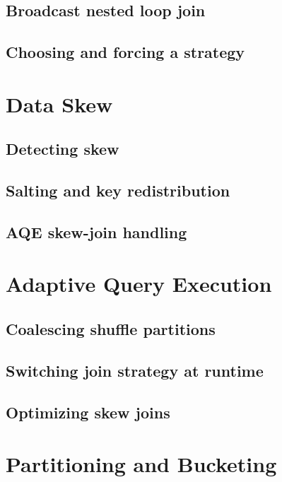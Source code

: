 \subsection{Broadcast nested loop join}
\tbd

\subsection{Choosing and forcing a strategy}
\tbd

\section{Data Skew}
\label{sec:qo-skew}

\subsection{Detecting skew}
\tbd

\subsection{Salting and key redistribution}
\tbd

\subsection{AQE skew-join handling}
\tbd

\section{Adaptive Query Execution}
\label{sec:qo-aqe}

\subsection{Coalescing shuffle partitions}
\tbd

\subsection{Switching join strategy at runtime}
\tbd

\subsection{Optimizing skew joins}
\tbd

\section{Partitioning and Bucketing}
\label{sec:qo-partitioning}

